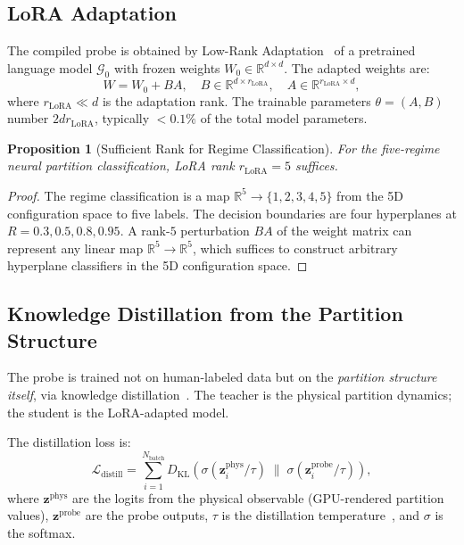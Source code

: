 \documentclass[aps,prd,twocolumn,superscriptaddress,floatfix,nofootinbib]{revtex4-2}
\newtheorem{proposition}[theorem]{Proposition}
\theoremstyle{remark}
\newcommand{\Probe}{\mathcal{G}}
\begin{document}
\subsection{LoRA Adaptation}

The compiled probe is obtained by Low-Rank Adaptation~\cite{hu2022lora} of a pretrained language model $\Probe_0$ with frozen weights $W_0 \in \mathbb{R}^{d \times d}$.
The adapted weights are:
\begin{equation}
W = W_0 + B A, \quad B \in \mathbb{R}^{d \times r_{\mathrm{LoRA}}}, \quad A \in \mathbb{R}^{r_{\mathrm{LoRA}} \times d},
\label{eq:lora}
\end{equation}
where $r_{\mathrm{LoRA}} \ll d$ is the adaptation rank.
The trainable parameters $\theta = (A, B)$ number $2 d r_{\mathrm{LoRA}}$, typically $< 0.1\%$ of the total model parameters.

\begin{proposition}[Sufficient Rank for Regime Classification]
\label{prop:lora_rank}
For the five-regime neural partition classification, LoRA rank $r_{\mathrm{LoRA}} = 5$ suffices.
\end{proposition}

\begin{proof}
The regime classification is a map $\mathbb{R}^5 \to \{1,2,3,4,5\}$ from the 5D configuration space to five labels.
The decision boundaries are four hyperplanes at $R = 0.3, 0.5, 0.8, 0.95$.
A rank-$5$ perturbation $BA$ of the weight matrix can represent any linear map $\mathbb{R}^5 \to \mathbb{R}^5$, which suffices to construct arbitrary hyperplane classifiers in the 5D configuration space.
\end{proof}

\subsection{Knowledge Distillation from the Partition Structure}

The probe is trained not on human-labeled data but on the \emph{partition structure itself}, via knowledge distillation~\cite{hinton2015distilling}.
The teacher is the physical partition dynamics; the student is the LoRA-adapted model.

The distillation loss is:
\begin{equation}
\mathcal{L}_{\mathrm{distill}} = \sum_{i=1}^{N_{\mathrm{batch}}} D_{\mathrm{KL}}\!\left(\sigma(\mathbf{z}_i^{\mathrm{phys}} / \tau) \;\|\; \sigma(\mathbf{z}_i^{\mathrm{probe}} / \tau)\right),
\label{eq:distill_loss}
\end{equation}
where $\mathbf{z}^{\mathrm{phys}}$ are the logits from the physical observable (GPU-rendered partition values), $\mathbf{z}^{\mathrm{probe}}$ are the probe outputs, $\tau$ is the distillation temperature~\cite{hinton2015distilling}, and $\sigma$ is the softmax.
\end{document}
